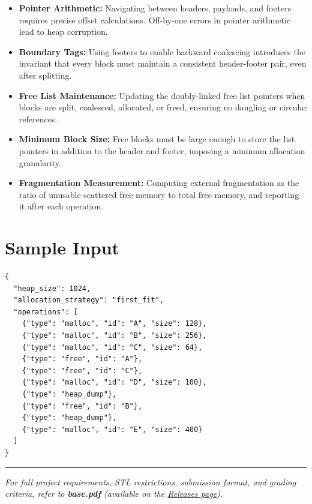 \begin{itemize}
  \item \textbf{Pointer Arithmetic:} Navigating between headers, payloads, and footers requires precise offset calculations. Off-by-one errors in pointer arithmetic lead to heap corruption.
  \item \textbf{Boundary Tags:} Using footers to enable backward coalescing introduces the invariant that every block must maintain a consistent header-footer pair, even after splitting.
  \item \textbf{Free List Maintenance:} Updating the doubly-linked free list pointers when blocks are split, coalesced, allocated, or freed, ensuring no dangling or circular references.
  \item \textbf{Minimum Block Size:} Free blocks must be large enough to store the list pointers in addition to the header and footer, imposing a minimum allocation granularity.
  \item \textbf{Fragmentation Measurement:} Computing external fragmentation as the ratio of unusable scattered free memory to total free memory, and reporting it after each operation.
\end{itemize}

\section{Sample Input}

\begin{lstlisting}[style=json, caption={data/input\_sample.json}]
{
  "heap_size": 1024,
  "allocation_strategy": "first_fit",
  "operations": [
    {"type": "malloc", "id": "A", "size": 128},
    {"type": "malloc", "id": "B", "size": 256},
    {"type": "malloc", "id": "C", "size": 64},
    {"type": "free", "id": "A"},
    {"type": "free", "id": "C"},
    {"type": "malloc", "id": "D", "size": 100},
    {"type": "heap_dump"},
    {"type": "free", "id": "B"},
    {"type": "heap_dump"},
    {"type": "malloc", "id": "E", "size": 400}
  ]
}
\end{lstlisting}

\vfill
\noindent\rule{\textwidth}{0.4pt}
{\small\textit{For full project requirements, STL restrictions, submission format, and grading criteria, refer to \textbf{base.pdf} (available on the \href{https://github.com/BestSithInEU/cse211-term-projects/releases}{Releases page}).}}
